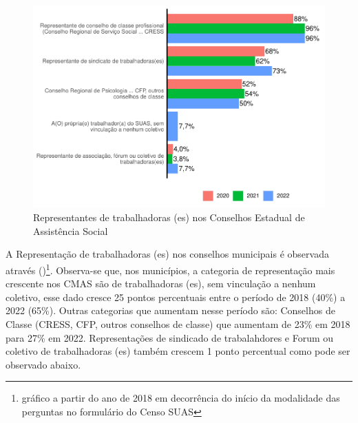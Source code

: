 \documentclass[
  brazilian]{report}
\begin{document}
\begin{figure}
\includegraphics{Censo-SUAS-2022_files/figure-latex/trab_rep-1} \caption[Representantes de trabalhadoras (es) nos Conselhos Estadual de Assistência Social]{Representantes de trabalhadoras (es) nos Conselhos Estadual de Assistência Social}\label{fig:trab_rep}
\end{figure}

A Representação de trabalhadoras (es) nos conselhos municipais é
observada através
()\footnote{gráfico a partir do ano de 2018 em decorrência do início da modalidade das perguntas no formulário do Censo SUAS}.
Observa-se que, nos municípios, a categoria de representação mais
crescente nos CMAS são de trabalhadoras (es), sem vinculação a nenhum
coletivo, esse dado cresce 25 pontos percentuais entre o período de 2018
(40\%) a 2022 (65\%). Outras categorias que aumentam nesse período são:
Conselhos de Classe (CRESS, CFP, outros conselhos de classe) que
aumentam de 23\% em 2018 para 27\% em 2022. Representações de sindicado
de trabalahdores e Forum ou coletivo de trabalhadoras (es) também
crescem 1 ponto percentual como pode ser observado abaixo.
\end{document}
